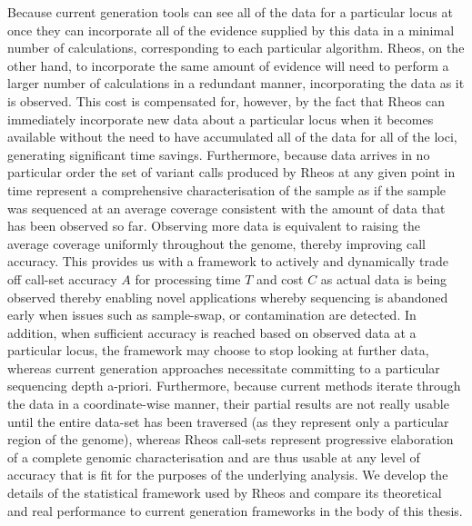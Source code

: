 Because current generation tools can see all of the data for a particular locus at once they can incorporate all of the evidence supplied by this data in a minimal number of calculations, corresponding to each particular algorithm\autocite{li2009sequence,garrison2012haplotype}. Rheos, on the other hand, to incorporate the same amount of evidence will need to perform a larger number of calculations in a redundant manner, incorporating the data as it is observed. This cost is compensated for, however, by the fact that Rheos can immediately incorporate new data about a particular locus when it becomes available without the need to have accumulated all of the data for all of the loci, generating significant time savings. Furthermore, because data arrives in no particular order the set of variant calls produced by Rheos at any given point in time represent a comprehensive characterisation of the sample as if the sample was sequenced at an average coverage consistent with the amount of data that has been observed so far. Observing more data is equivalent to raising the average coverage uniformly throughout the genome, thereby improving call accuracy\autocite{alioto2015comprehensive}. This provides us with a framework to actively and dynamically trade off call-set accuracy $A$ for processing time $T$ and cost $C$ as actual data is being observed thereby enabling novel applications whereby sequencing is abandoned early when issues such as sample-swap\autocite{ewen2000identification}, or contamination\autocite{cibulskis2011contest} are detected. In addition, when sufficient accuracy is reached based on observed data at a particular locus, the framework may choose to stop looking at further data, whereas current generation approaches necessitate committing to a particular sequencing depth a-priori. Furthermore, because current methods iterate through the data in a coordinate-wise manner, their partial results are not really usable until the entire data-set has been traversed (as they represent only a particular region of the genome), whereas Rheos call-sets represent progressive elaboration of a complete genomic characterisation and are thus usable at any level of accuracy that is fit for the purposes of the underlying analysis. We develop the details of the statistical framework used by Rheos and compare its theoretical and real performance to current generation frameworks in the body of this thesis.

